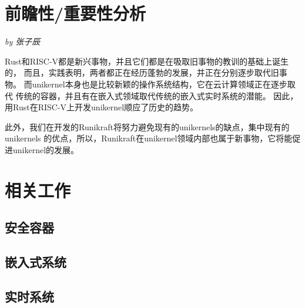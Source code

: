 \documentclass[UTF8,fontset=none,linespread=1.15]{ctexart}
\let\nosupcite\cite
\renewcommand*{\cite}[1]{\textsuperscript{\nosupcite{#1}}}
\newcommand{\sectionauthor}[1]{%
\vspace*{-5ex}
\noindent\textrm{\hfill\textit{by #1}}
\vspace*{2ex}\par}
\begin{document}

\section{前瞻性/重要性分析}\sectionauthor{张子辰}
Rust和RISC-V都是新兴事物，并且它们都是在吸取旧事物的教训的基础上诞生的，
而且，实践表明，两者都正在经历蓬勃的发展，并正在分别逐步取代旧事物。
而unikernel本身也是比较新颖的操作系统结构，它在云计算领域正在逐步取代
传统的容器，并且有在嵌入式领域取代传统的嵌入式实时系统的潜能。
因此，用Rust在RISC-V上开发unikernel顺应了历史的趋势。

此外，我们在开发的Runikraft将努力避免现有的unikernels的缺点，集中现有的unikernels
的优点，所以，Runikraft在unikernel领域内部也属于新事物，它将能促进unikernel的发展。
\section{相关工作}
\subsection{安全容器}
\subsection{嵌入式系统}
\subsection{实时系统}
\end{document}
